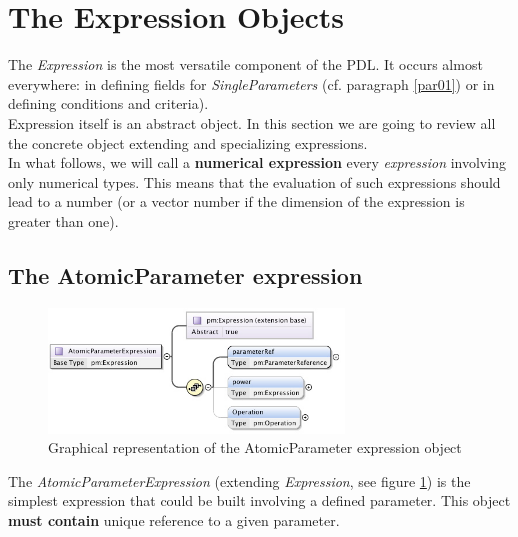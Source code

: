 \documentclass[a4paper,11pt] {ivoa}
\begin{document}
\section{The Expression Objects}\label{par02}
The {\it Expression} is the most versatile component of the PDL. It occurs almost everywhere: in
defining fields for {\it SingleParameters} (cf. paragraph \ref{par01}) or in defining conditions and
criteria).\\
Expression itself is an abstract object. In this section we are going to review all the concrete
object extending and specializing expressions.\\

 In what follows, we will call a {\bf numerical expression} every {\it
expression} involving only numerical types. This means that the evaluation of such expressions
should lead to a number (or a vector number if the dimension of the expression is greater than
one).\\


\subsection{The AtomicParameter expression}\label{par02_01}
\begin{figure}[htbp]
\begin{center}
\includegraphics[width=0.7\textwidth]{pictures/AtomicParameter.jpg} 
\caption{Graphical representation of the AtomicParameter expression object}
\label{Pic-AtomicParameter}
\end{center}
\end{figure}
The {\it AtomicParameterExpression} (extending {\it Expression}, see figure
\ref{Pic-AtomicParameter}) is the simplest expression that could be built involving a defined
parameter. This object {\bf must contain} unique reference to a given parameter.\\
\end{document}
